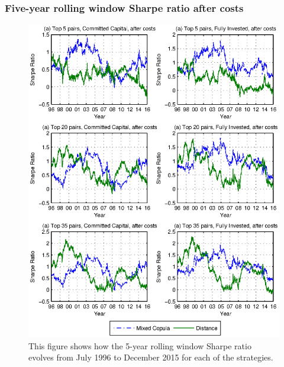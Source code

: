 \documentclass[pdf,9pt,xcolor=dvipsnames,hide notes]{beamer}
\begin{document}
\begin{frame}[label=frame5b]
\frametitle{Five-year rolling window Sharpe ratio after costs}

\begin{figure}[!ht]
\centering
\includegraphics[scale=0.48]{Figure4.eps}
\captionsetup{justification=raggedright,
	singlelinecheck=false
}
\caption*{\tiny This figure shows how the 5-year rolling window Sharpe ratio evolves from July 1996 to December 2015 for each of the strategies.}
\label{fig:fig4}
\end{figure}

\end{frame}
\end{document}
